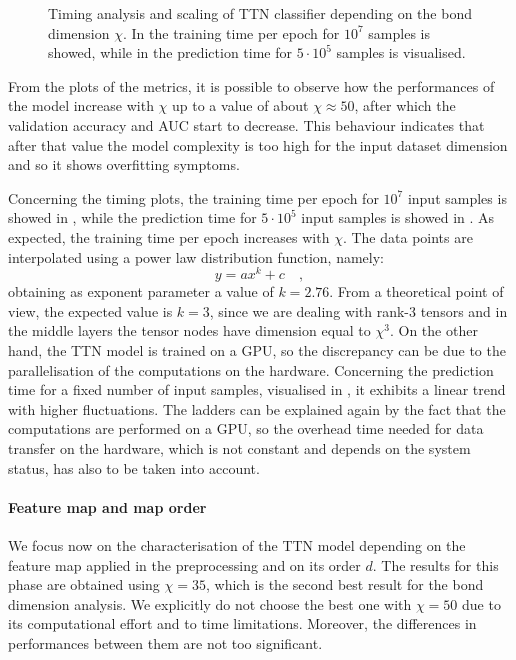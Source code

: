\documentclass[../main/main.tex]{subfiles}
\begin{document}
\begin{figure}[!h]
\begin{minipage}[c]{0.50\textwidth}
{            \label{fig:results_characterisation_bond_timing_prediction}
        }
    \end{minipage}%
    \caption{Timing analysis and scaling of TTN classifier depending on the bond dimension \( \chi \). In  the training time per epoch for \( 10^{7} \) samples is showed, while in  the prediction time for \( 5\cdot 10^{5} \) samples is visualised.}
    \label{fig:results_characterisation_bond_timing}
\end{figure}


From the plots of the metrics, it is possible to observe how the performances of the model increase with \( \chi \) up to a value of about \( \chi \approx 50 \), after which the validation accuracy and AUC start to decrease. This behaviour indicates that after that value the model complexity is too high for the input dataset dimension and so it shows overfitting symptoms.

Concerning the timing plots, the training time per epoch for \( 10^{7} \) input samples is showed in , while the prediction time for \( 5 \cdot 10^{5} \) input samples is showed in . As expected, the training time per epoch increases with \( \chi \). The data points are interpolated using a power law distribution function, namely:
\begin{equation}
    y
    =
    ax^{k} + c
    \quad ,
\end{equation}
obtaining as exponent parameter a value of \( k = 2.76 \). From a theoretical point of view, the expected value is \( k = 3 \), since we are dealing with rank-3 tensors and in the middle layers the tensor nodes have dimension equal to \( \chi^{3} \). On the other hand, the TTN model is trained on a GPU, so the discrepancy can be due to the parallelisation of the computations on the hardware.
Concerning the prediction time for a fixed number of input samples, visualised in , it exhibits a linear trend with higher fluctuations. The ladders can be explained again by the fact that the computations are performed on a GPU, so the overhead time needed for data transfer on the hardware, which is not constant and depends on the system status, has also to be taken into account.


\paragraph{Feature map and map order}
We focus now on the characterisation of the TTN model depending on the feature map applied in the preprocessing and on its order \( d \). The results for this phase are obtained using \( \chi = 35 \), which is the second best result for the bond dimension analysis. We explicitly do not choose the best one with \( \chi = 50 \) due to its computational effort and to time limitations. Moreover, the differences in performances between them are not too significant.
\end{document}
